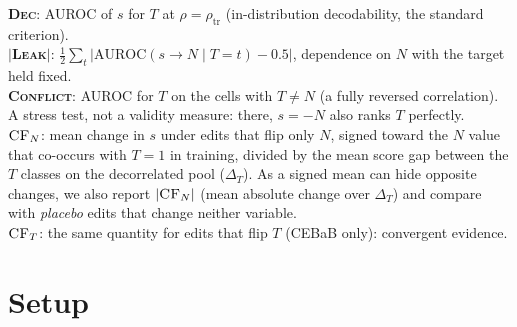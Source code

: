 \documentclass[11pt]{article}
\newcommand{\rhot}{\rho_{\text{tr}}}
\newcommand{\dec}{\textsc{Dec}}
\newcommand{\cfn}{\textsc{CF}_{N}}
\newcommand{\cft}{\textsc{CF}_{T}}
\newcommand{\conf}{\textsc{Conflict}}
\newcommand{\leak}{\textsc{Leak}}
\begin{document}
\noindent\textbf{\dec{}}: AUROC of $s$ for $T$ at $\rho=\rhot$ (in-distribution decodability, the standard criterion).\\
\textbf{$|$\leak{}$|$}: $\tfrac12\sum_{t}|\mathrm{AUROC}(s\to N\mid T{=}t)-0.5|$, dependence on $N$ with the target held fixed.\\
\textbf{\conf{}}: AUROC for $T$ on the cells with $T\neq N$ (a fully reversed correlation). A stress test, not a validity measure: there, $s=-N$ also ranks $T$ perfectly.\\
\textbf{$\cfn$}: mean change in $s$ under edits that flip only $N$, signed toward the $N$ value that co-occurs with $T{=}1$ in training, divided by the mean score gap between the $T$ classes on the decorrelated pool ($\Delta_T$). As a signed mean can hide opposite changes, we also report $|\cfn|$ (mean absolute change over $\Delta_T$) and compare with \emph{placebo} edits that change neither variable.\\
\textbf{$\cft$}: the same quantity for edits that flip $T$ (CEBaB only): convergent evidence.

\section{Setup}
\label{sec:setup}

\begin{table}[t]
\centering\small\setlength{\tabcolsep}{2pt}
\resizebox{\columnwidth}{!}{}
\caption{Settings. Edits: generated nuisance-edit pairs (Amazon: those passing automatic checks); judged by both: pairs rated by both LLM judges; accepted: share of jointly judged pairs both accept (\S\ref{sec:setup}). $^*$Civil (rule-based identity swaps, forward/reverse) is reported in Appendix~\ref{app:civil} only.}
\label{tab:data}
\end{table}
\end{document}
